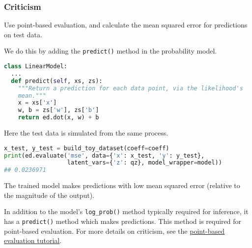 \subsubsection{Criticism}

Use point-based evaluation, and calculate the mean squared
error for predictions on test data.

We do this by adding the \texttt{predict()} method in the
probability model.
\begin{lstlisting}[language=Python]
class LinearModel:
  ...
  def predict(self, xs, zs):
    """Return a prediction for each data point, via the likelihood's
    mean."""
    x = xs['x']
    w, b = zs['w'], zs['b']
    return ed.dot(x, w) + b
\end{lstlisting}

Here the test data is simulated from the same process.
\begin{lstlisting}[language=Python]
x_test, y_test = build_toy_dataset(coeff=coeff)
print(ed.evaluate('mse', data={'x': x_test, 'y': y_test},
                  latent_vars={'z': qz}, model_wrapper=model))
## 0.0236971
\end{lstlisting}

The trained model makes predictions with low mean squared error
(relative to the magnitude of the output).

In addition to the model's \texttt{log_prob()} method typically required for
inference, it has a \texttt{predict()} method which makes
predictions. This method is required for point-based evaluation. For
more details on criticism, see the \href{tut_point_eval}{point-based
evaluation tutorial}.
